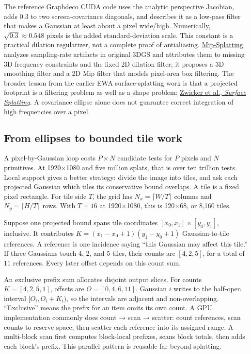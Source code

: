 The reference Graphdeco CUDA code uses the analytic perspective Jacobian, adds \(0.3\) to two screen-covariance diagonals, and describes it as a low-pass filter that makes a Gaussian at least about a pixel wide/high. Numerically, \(\sqrt{0.3}\approx0.548\) pixels is the added standard-deviation scale. This constant is a practical dilation regularizer, not a complete proof of antialiasing. \href{https://openaccess.thecvf.com/content/CVPR2024/html/Yu_Mip-Splatting_Alias-free_3D_Gaussian_Splatting_CVPR_2024_paper.html}{Mip-Splatting} analyzes sampling-rate artifacts in original 3DGS and attributes them to missing 3D frequency constraints and the fixed 2D dilation filter; it proposes a 3D smoothing filter and a 2D Mip filter that models pixel-area box filtering. The broader lesson from the earlier EWA surface-splatting work is that a projected footprint is a filtering problem as well as a shape problem: \href{https://www.cs.princeton.edu/courses/archive/spr01/cs598b/papers/zwicker01.pdf}{Zwicker et al., \emph{Surface Splatting}}. A covariance ellipse alone does not guarantee correct integration of high frequencies over a pixel.

\subsection{From ellipses to bounded tile work}\label{04-visual-computing-ii-ch037-from-ellipses-to-bounded-tile-work}

A pixel-by-Gaussian loop costs \(P\times N\) candidate tests for \(P\) pixels and \(N\) primitives. At 1920×1080 and five million splats, that is over ten trillion tests. Local support gives a better strategy: divide the image into tiles, and ask each projected Gaussian which tiles its conservative bound overlaps. A tile is a fixed pixel rectangle. For tile side \(T\), the grid has \(N_x=\lceil W/T\rceil\) columns and \(N_y=\lceil H/T\rceil\) rows. With \(T=16\) at 1920×1080, this is 120×68, or 8,160 tiles.

Suppose one projected bound spans tile coordinates \([x_0,x_1]\times[y_0,y_1]\), inclusive. It contributes \(K=(x_1-x_0+1)(y_1-y_0+1)\) Gaussian-to-tile references. A reference is one incidence saying ``this Gaussian may affect this tile.'' If three Gaussians touch 4, 2, and 5 tiles, their counts are \([4,2,5]\), for a total of \(11\) references. Every later offset depends on this count sum.

An exclusive prefix sum allocates disjoint output slices. For counts \(K=[4,2,5,1]\), offsets are \(O=[0,4,6,11]\). Gaussian \(i\) writes to the half-open interval \([O_i,O_i+K_i)\), so the intervals are adjacent and non-overlapping. ``Exclusive'' means the prefix for an item omits its own count. A GPU implementation commonly does count → scan → scatter: count references, scan counts to reserve space, then scatter each reference into its assigned range. A multi-block scan first computes block-local prefixes, scans block totals, then adds each block's prefix. This parallel pattern is reusable far beyond splatting.

